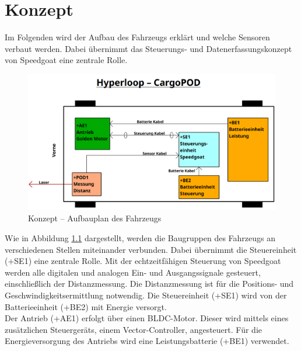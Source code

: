 \chapter{Konzept}
\label{chapter:Konzept}


Im Folgenden wird der Aufbau des Fahrzeugs erklärt und welche Sensoren verbaut werden. Dabei übernimmt das Steuerungs- und Datenerfassungskonzept von Speedgoat eine zentrale Rolle.\\
\pagebreak[1]
\begin{figure}[!ht]
	\begin{center}
		\includegraphics[width=.95\textwidth]{img/3_schaltplan/sp_aufbauplan_0.png}
		\caption{Konzept – Aufbauplan des Fahrzeugs}
		\label{img_1_1:Konzept:0}
	\end{center}
\end{figure}
\pagebreak[1]
Wie in Abbildung \ref{img_1_1:Konzept:0} dargestellt, werden die Baugruppen des Fahrzeugs an verschiedenen Stellen miteinander verbunden. Dabei übernimmt die Steuereinheit (+SE1) eine zentrale Rolle. Mit der echtzeitfähigen Steuerung von Speedgoat werden alle digitalen und analogen Ein- und Ausgangssignale gesteuert, einschließlich der Distanzmessung. Die Distanzmessung ist für die Positions- und Geschwindigkeitsermittlung notwendig. Die Steuereinheit (+SE1) wird von der Batterieeinheit (+BE2) mit Energie versorgt.\\
Der Antrieb (+AE1) erfolgt über einen BLDC-Motor. Dieser wird mittels eines zusätzlichen Steuergeräts, einem Vector-Controller, angesteuert. Für die Energieversorgung des Antriebs wird eine Leistungsbatterie (+BE1) verwendet.

